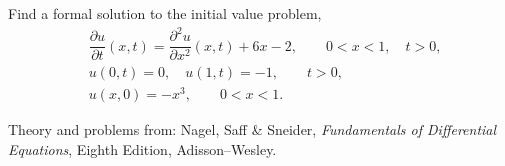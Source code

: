 \documentclass[11pt]{article}
\begin{document}
\begin{problem}
Find a formal solution to the initial value problem,
\begin{equation*} \begin{split}
& \dfrac{\partial u }{\partial t } (x,t) = \dfrac{\partial^2 u}{\partial x^2}(x,t) + 6 x -2, \qquad 0<x<1, \quad t>0, \\
& u(0,t) = 0, \quad u(1,t)= -1, \qquad t>0, \\
& u(x,0) = -x^{3}, \qquad 0<x<1.
\end{split}\end{equation*}
\end{problem}





\LabSolutions


Theory and problems from: Nagel, Saff \& Sneider, \textit{Fundamentals of Differential Equations}, Eighth Edition, Adisson--Wesley.

\vspace{20pt}
\end{document}
